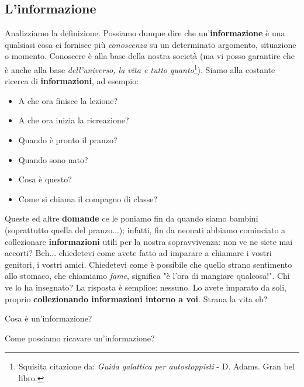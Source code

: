 \documentclass[11pt,fleqn,a5paper]{book} %
\begin{document}
    		\subsection{L'informazione}
    		\label{sub: L'informazione}
    			Analizziamo la definizione. Possiamo dunque dire che un'\textbf{informazione} è una qualsiasi cosa ci fornisce più \textit{conoscenza} su un determinato argomento, situazione o momento. Conoscere è alla base della nostra società (ma vi posso garantire che è anche  alla base \textit{dell'universo, la vita e tutto quanto}\footnote{Squisita citazione da: \textit{Guida galattica per autostoppisti} - D. Adams. Gran bel libro.}). Siamo alla costante ricerca di \textbf{informazioni}, ad esempio:
    			\begin{itemize}
    				\item A che ora finisce la lezione?
    				\item A che ora inizia la ricreazione?
    				\item Quando è pronto il pranzo?
    				\item Quando sono nato?
    				\item Cosa è questo?
    				\item Come si chiama il compagno di classe?
    			\end{itemize}
    			Queste ed altre \textbf{domande} ce le poniamo fin da quando siamo bambini (soprattutto quella del pranzo...); infatti, fin da neonati abbiamo cominciato a collezionare \textbf{informazioni} utili per la nostra sopravvivenza: non ve ne siete mai accorti? Beh... chiedetevi come avete fatto ad imparare a chiamare i vostri genitori, i vostri amici. Chiedetevi come è possibile che quello strano sentimento allo stomaco, che chiamiamo \textit{fame}, significa "è l'ora di mangiare qualcosa!". Chi ve lo ha insegnato? La risposta è semplice: nessuno. Lo avete imparato da soli, proprio \textbf{collezionando informazioni intorno a voi}. Strana la vita eh?
    			
    			\begin{exercise}
    				Cosa è un'informazione?
    			\end{exercise}
    			\begin{exercise}
    				Come possiamo ricavare un'informazione?
    			\end{exercise}
    			
\end{document}

